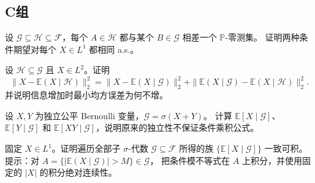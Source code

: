 \subsection*{C组}
\begin{enumerate}[label=\textbf{\thechapter.\arabic*.},resume]
设 $\mathcal G\subseteq\mathcal H\subseteq\mathcal F$，每个
$A\in\mathcal H$ 都与某个 $B\in\mathcal G$ 相差一个 $\mathbb P$-零测集。
证明两种条件期望对每个 $X\in L^1$ 都相同 a.s.。

设 $\mathcal H\subseteq\mathcal G$ 且 $X\in L^2$。证明
\[
 \|X-\mathbb E(X\mid\mathcal H)\|_2^2
 =\|X-\mathbb E(X\mid\mathcal G)\|_2^2
   +\|\mathbb E(X\mid\mathcal G)-\mathbb E(X\mid\mathcal H)\|_2^2.
\]
并说明信息增加时最小均方误差为何不增。

设 $X,Y$ 为独立公平 Bernoulli 变量，$\mathcal G=\sigma(X+Y)$。
计算 $\mathbb E[X\mid\mathcal G]$、$\mathbb E[Y\mid\mathcal G]$ 和
$\mathbb E[XY\mid\mathcal G]$，说明原来的独立性不保证条件乘积公式。

固定 $X\in L^1$。证明遍历全部子 $\sigma$-代数 $\mathcal G\subseteq\mathcal F$
所得的族 $\{\mathbb E[X\mid\mathcal G]\}$ 一致可积。
提示：对 $A=\{|\mathbb E(X\mid\mathcal G)|>M\}\in\mathcal G$，
把条件模不等式在 $A$ 上积分，并使用固定的 $|X|$ 的积分绝对连续性。
\end{enumerate}
